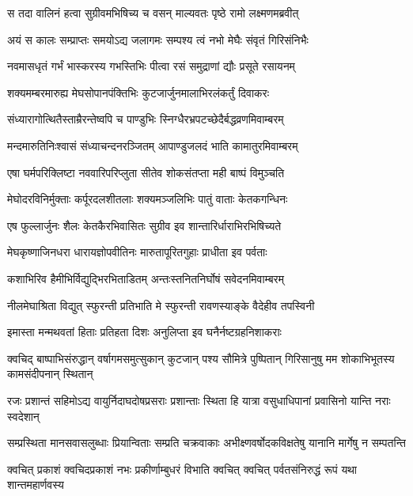 
\twolineshloka
{स तदा वालिनं हत्वा सुग्रीवमभिषिच्य च}
{वसन् माल्यवतः पृष्ठे रामो लक्ष्मणमब्रवीत्} %

\twolineshloka
{अयं स कालः सम्प्राप्तः समयोऽद्य जलागमः}
{सम्पश्य त्वं नभो मेघैः संवृतं गिरिसंनिभैः} %

\twolineshloka
{नवमासधृतं गर्भं भास्करस्य गभस्तिभिः}
{पीत्वा रसं समुद्राणां द्यौः प्रसूते रसायनम्} %

\twolineshloka
{शक्यमम्बरमारुह्य मेघसोपानपंक्तिभिः}
{कुटजार्जुनमालाभिरलंकर्तुं दिवाकरः} %

\twolineshloka
{संध्यारागोत्थितैस्ताम्रैरन्तेष्वपि च पाण्डुभिः}
{स्निग्धैरभ्रपटच्छेदैर्बद्धव्रणमिवाम्बरम्} %

\twolineshloka
{मन्दमारुतिनिःश्वासं संध्याचन्दनरञ्जितम्}
{आपाण्डुजलदं भाति कामातुरमिवाम्बरम्} %

\twolineshloka
{एषा घर्मपरिक्लिष्टा नववारिपरिप्लुता}
{सीतेव शोकसंतप्ता मही बाष्पं विमुञ्चति} %

\twolineshloka
{मेघोदरविनिर्मुक्ताः कर्पूरदलशीतलाः}
{शक्यमञ्जलिभिः पातुं वाताः केतकगन्धिनः} %

\twolineshloka
{एष फुल्लार्जुनः शैलः केतकैरभिवासितः}
{सुग्रीव इव शान्तारिर्धाराभिरभिषिच्यते} %

\twolineshloka
{मेघकृष्णाजिनधरा धारायज्ञोपवीतिनः}
{मारुतापूरितगुहाः प्राधीता इव पर्वताः} %

\twolineshloka
{कशाभिरिव हैमीभिर्विद्युद्भिरभिताडितम्}
{अन्तःस्तनितनिर्घोषं सवेदनमिवाम्बरम्} %

\twolineshloka
{नीलमेघाश्रिता विद्युत् स्फुरन्ती प्रतिभाति मे}
{स्फुरन्ती रावणस्याङ्के वैदेहीव तपस्विनी} %

\twolineshloka
{इमास्ता मन्मथवतां हिताः प्रतिहता दिशः}
{अनुलिप्ता इव घनैर्नष्टग्रहनिशाकराः} %

\threelineshloka
{क्वचिद् बाष्पाभिसंरुद्धान् वर्षागमसमुत्सुकान्}
{कुटजान् पश्य सौमित्रे पुष्पितान् गिरिसानुषु}
{मम शोकाभिभूतस्य कामसंदीपनान् स्थितान्} %

\twolineshloka
{रजः प्रशान्तं सहिमोऽद्य वायुर्निदाघदोषप्रसराः प्रशान्ताः}
{स्थिता हि यात्रा वसुधाधिपानां प्रवासिनो यान्ति नराः स्वदेशान्} %

\twolineshloka
{सम्प्रस्थिता मानसवासलुब्धाः प्रियान्विताः सम्प्रति चक्रवाकाः}
{अभीक्ष्णवर्षोदकविक्षतेषु यानानि मार्गेषु न सम्पतन्ति} %

\twolineshloka
{क्वचित् प्रकाशं क्वचिदप्रकाशं नभः प्रकीर्णाम्बुधरं विभाति}
{क्वचित् क्वचित् पर्वतसंनिरुद्धं रूपं यथा शान्तमहार्णवस्य} %

